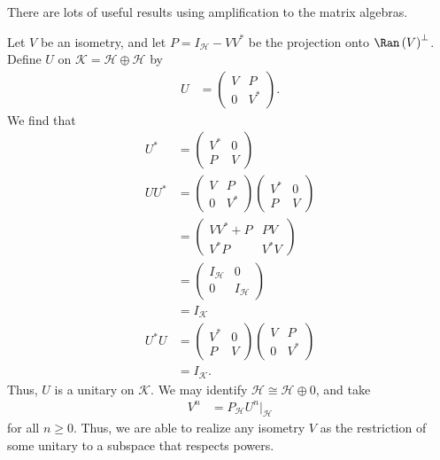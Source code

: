\documentclass[10pt]{mypackage}
\begin{document}
There are lots of useful results using amplification to the matrix algebras.
\begin{example}
  Let $V$ be an isometry, and let $P = I_{\mathcal{H}} - VV^{\ast}$ be the projection onto $\Ran\left( V \right)^{\perp}$. Define $U$ on $\mathcal{K} = \mathcal{H} \oplus \mathcal{H}$ by
  \begin{align*}
    U &= \begin{pmatrix}V & P \\ 0 & V^{\ast}\end{pmatrix}.
  \end{align*}
  We find that
  \begin{align*}
    U^{\ast} &= \begin{pmatrix}V^{\ast} & 0 \\ P & V\end{pmatrix}\\
    UU^{\ast} &= \begin{pmatrix}V & P \\ 0 & V^{\ast}\end{pmatrix} \begin{pmatrix}V^{\ast} & 0 \\ P & V\end{pmatrix}\\
              &= \begin{pmatrix}VV^{\ast} + P  & PV \\ V^{\ast}P & V^{\ast}V\end{pmatrix}\\
              &= \begin{pmatrix}I_{\mathcal{H}} & 0 \\ 0 & I_{\mathcal{H}}\end{pmatrix}\\
              &= I_{\mathcal{K}}\\
    U^{\ast}U &= \begin{pmatrix}V^{\ast} & 0 \\ P & V\end{pmatrix} \begin{pmatrix}V & P \\ 0 & V^{\ast}\end{pmatrix}\\
              &= I_{\mathcal{K}}.
  \end{align*}
  Thus, $U$ is a unitary on $\mathcal{K}$. We may identify $\mathcal{H} \cong \mathcal{H}\oplus 0$, and take
  \begin{align*}
    V^n &= P_{\mathcal{H}}U^{n}|_{\mathcal{H}}
  \end{align*}
  for all $n\geq 0$. Thus, we are able to realize any isometry $V$ as the restriction of some unitary to a subspace that respects powers.
\end{example}
\end{document}
